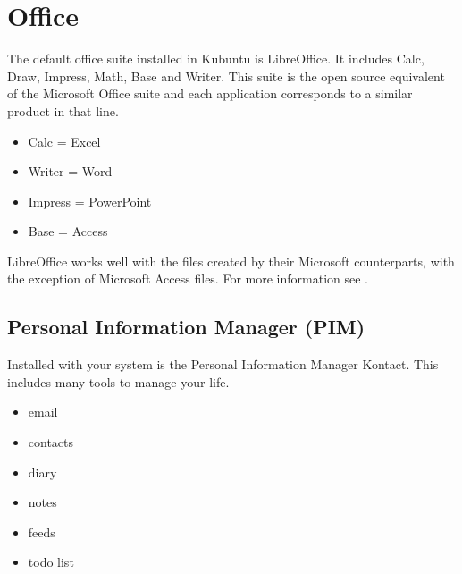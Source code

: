 \documentclass[letterpaper,10pt,english]{sphinxmanual}
\begin{document}
\section{Office}
\label{\detokenize{docs/software:office}}
\sphinxAtStartPar
The default office suite installed in Kubuntu is LibreOffice. It includes Calc, Draw, Impress, Math, Base and Writer. This suite is the open source equivalent of the Microsoft Office suite and each application corresponds to a similar product in that line.
\begin{itemize}
\item {} 
\sphinxAtStartPar
Calc = Excel

\item {} 
\sphinxAtStartPar
Writer = Word

\item {} 
\sphinxAtStartPar
Impress = PowerPoint

\item {} 
\sphinxAtStartPar
Base = Access

\end{itemize}

\sphinxAtStartPar
LibreOffice works well with the files created by their Microsoft counterparts, with the exception of Microsoft Access files. For more information see .


\subsection{Personal Information Manager (PIM)}
\label{\detokenize{docs/software:personal-information-manager-pim}}
\sphinxAtStartPar
Installed with your system is the  Personal Information Manager Kontact. This includes many tools to manage your life.
\begin{itemize}
\item {} 
\sphinxAtStartPar
email

\item {} 
\sphinxAtStartPar
contacts

\item {} 
\sphinxAtStartPar
diary

\item {} 
\sphinxAtStartPar
notes

\item {} 
\sphinxAtStartPar
feeds

\item {} 
\sphinxAtStartPar
to\sphinxhyphen{}do list

\end{itemize}
\end{document}
